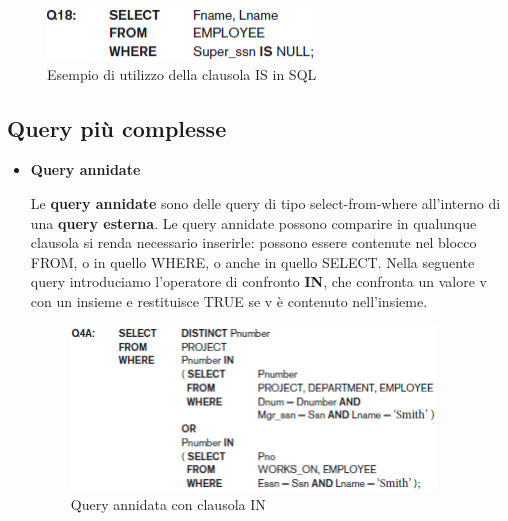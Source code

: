 \begin{center}
\begin{figure}[H]
\centering
\includegraphics[scale=1]{figures/ISNULL.png}
\caption{Esempio di utilizzo della clausola IS in SQL} 
\end{figure}
\end{center}

\subsection{Query più complesse}

\begin{itemize}

\item{\textbf{Query annidate}}

Le \textbf{query annidate} sono delle query di tipo select-from-where all’interno di una \textbf{query esterna}. Le query annidate possono comparire in qualunque clausola si renda necessario inserirle: possono essere contenute nel blocco FROM, o in quello WHERE, o anche in quello SELECT. Nella seguente query introduciamo l’operatore di confronto \textbf{IN}, che confronta un valore v con un insieme e restituisce TRUE se v è contenuto nell’insieme. 

\begin{center}
\begin{figure}[H]
\centering
\includegraphics[scale=1]{figures/IN.png}
\caption{Query annidata con clausola IN} 
\end{figure}
\end{center}


\end{itemize}
